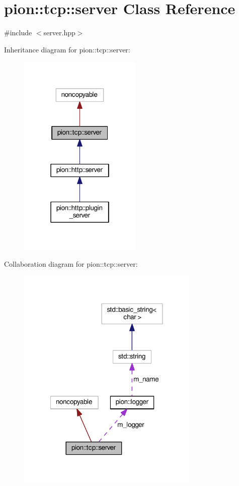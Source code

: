 \hypertarget{classpion_1_1tcp_1_1server}{\section{pion\-:\-:tcp\-:\-:server Class Reference}
\label{classpion_1_1tcp_1_1server}
}


{\ttfamily \#include $<$server.\-hpp$>$}



Inheritance diagram for pion\-:\-:tcp\-:\-:server\-:
\nopagebreak
\begin{figure}[H]
\begin{center}
\leavevmode
\includegraphics[width=166pt]{classpion_1_1tcp_1_1server__inherit__graph}
\end{center}
\end{figure}


Collaboration diagram for pion\-:\-:tcp\-:\-:server\-:
\nopagebreak
\begin{figure}[H]
\begin{center}
\leavevmode
\includegraphics[width=246pt]{classpion_1_1tcp_1_1server__coll__graph}
\end{center}
\end{figure}
